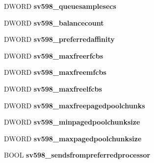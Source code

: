 \begin{DoxyCompactItemize}
D\+W\+O\+RD {\bfseries sv598\+\_\+queuesamplesecs}
\item 
\mbox{\label{struct___s_e_r_v_e_r___i_n_f_o__598_a37dc9461898df51e0e67c080a00309ec}} 
D\+W\+O\+RD {\bfseries sv598\+\_\+balancecount}
\item 
\mbox{\label{struct___s_e_r_v_e_r___i_n_f_o__598_ac5f182e56468a21fb7eee3f8adcd8d45}} 
D\+W\+O\+RD {\bfseries sv598\+\_\+preferredaffinity}
\item 
\mbox{\label{struct___s_e_r_v_e_r___i_n_f_o__598_a751605f239f8b4fd5552d68c5b9b008f}} 
D\+W\+O\+RD {\bfseries sv598\+\_\+maxfreerfcbs}
\item 
\mbox{\label{struct___s_e_r_v_e_r___i_n_f_o__598_aa3c0a77e859a1a4c67113c10ec07fbec}} 
D\+W\+O\+RD {\bfseries sv598\+\_\+maxfreemfcbs}
\item 
\mbox{\label{struct___s_e_r_v_e_r___i_n_f_o__598_ab0a8cf9e455cd0c42b5b4d4cc9daffea}} 
D\+W\+O\+RD {\bfseries sv598\+\_\+maxfreelfcbs}
\item 
\mbox{\label{struct___s_e_r_v_e_r___i_n_f_o__598_ae8d03159603aad86701e94ef3b82b468}} 
D\+W\+O\+RD {\bfseries sv598\+\_\+maxfreepagedpoolchunks}
\item 
\mbox{\label{struct___s_e_r_v_e_r___i_n_f_o__598_a61cfc6b4f6dc5cf60c406f614450ffc2}} 
D\+W\+O\+RD {\bfseries sv598\+\_\+minpagedpoolchunksize}
\item 
\mbox{\label{struct___s_e_r_v_e_r___i_n_f_o__598_a1aebe2d90f3415b2e5ddc4c27063668a}} 
D\+W\+O\+RD {\bfseries sv598\+\_\+maxpagedpoolchunksize}
\item 
\mbox{\label{struct___s_e_r_v_e_r___i_n_f_o__598_ae21d1f23b9ca1d5dfda399b47b286f05}} 
B\+O\+OL {\bfseries sv598\+\_\+sendsfrompreferredprocessor}
\item 
\mbox{\label{struct___s_e_r_v_e_r___i_n_f_o__598_a0404b465abcb9517913f503516c06b7b}} 

\end{DoxyCompactItemize}
